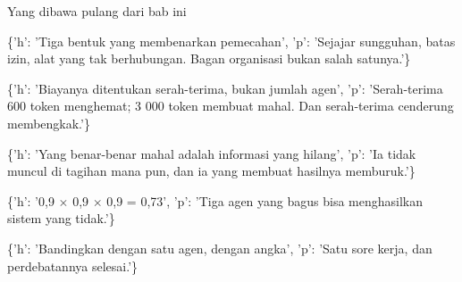 \documentclass[aspectratio=169,11pt,t]{beamer}
\begin{document}
\begin{frame}[shrink=25]{Yang dibawa pulang dari bab ini}
\begin{isteps}
\item \{'h': 'Tiga bentuk yang membenarkan pemecahan', 'p': 'Sejajar sungguhan, batas izin, alat yang tak berhubungan. Bagan organisasi bukan salah satunya.'\}
\item \{'h': 'Biayanya ditentukan serah-terima, bukan jumlah agen', 'p': 'Serah-terima 600 token menghemat; 3 000 token membuat mahal. Dan serah-terima cenderung membengkak.'\}
\item \{'h': 'Yang benar-benar mahal adalah informasi yang hilang', 'p': 'Ia tidak muncul di tagihan mana pun, dan ia yang membuat hasilnya memburuk.'\}
\item \{'h': '0,9 $\times$ 0,9 $\times$ 0,9 = 0,73', 'p': 'Tiga agen yang bagus bisa menghasilkan sistem yang tidak.'\}
\item \{'h': 'Bandingkan dengan satu agen, dengan angka', 'p': 'Satu sore kerja, dan perdebatannya selesai.'\}
\end{isteps}
\end{frame}
\end{document}
